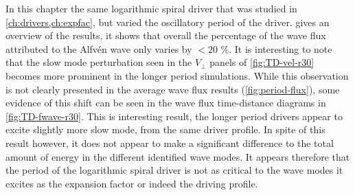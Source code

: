 In this chapter the same logarithmic spiral driver that was studied in \cref{ch:drivers,ch:expfac}, but varied the oscillatory period of the driver.
 gives an overview of the results, it shows that overall the percentage of the wave flux attributed to the Alfv\'en wave only varies by $<20$ \%.
It is interesting to note that the slow mode perturbation seen in the $V_\perp$ panels of \cref{fig:TD-vel-r30} becomes more prominent in the longer period simulations.
While this observation is not clearly presented in the average wave flux results (\cref{fig:period-flux}), some evidence of this shift can be seen in the wave flux time-distance diagrams in \cref{fig:TD-fwave-r30}.
This is interesting result, the longer period drivers appear to excite slightly more slow mode, from the same driver profile.
In spite of this result however, it does not appear to make a significant difference to the total amount of energy in the different identified wave modes.
It appears therefore that the period of the logarithmic spiral driver is not as critical to the wave modes it excites as the expansion factor or indeed the driving profile.



